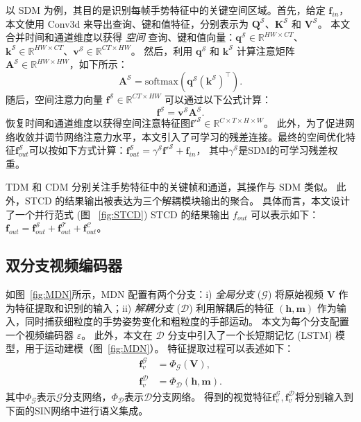 以 SDM 为例，其目的是识别每帧手势特征中的关键空间区域。首先，给定 $\mathbf{f}_{in}$，本文使用 Conv3d 来导出查询、键和值特征，分别表示为 $\mathbf{Q}^{\mathcal{S}}$、$\mathbf{K}^{\mathcal{S}}$ 和 $\mathbf{V}^{\mathcal{S}}$。
本文合并时间和通道维度以获得 \emph{空间} 查询、键和值向量：$\mathbf{q}^{\mathcal{S}}\in \mathbb{R}^{HW\times CT}$、$\mathbf{k}^{\mathcal{S}}\in \mathbb{R}^{HW\times CT}$、$\mathbf{v}^{\mathcal{S}}\in \mathbb{R}^{CT\times HW}$。
然后，利用 $\mathbf{q}^{\mathcal{S}}$ 和 $\mathbf{k}^{\mathcal{S}}$ 计算注意矩阵 $\mathbf{A}^{\mathcal{S}}\in \mathbb{R}^{HW\times HW}$，如下所示：
\begin{equation}
\mathbf{A}^{\mathcal{S}} = \text{softmax}\left(\mathbf{q}^{\mathcal{S}}\left(\mathbf{k}^{\mathcal{S}}\right)^{\top}\right).
\end{equation}
随后，空间注意力向量 $\mathbf{f}^{\mathcal{S}}\in \mathbb{R}^{CT\times HW}$ 可以通过以下公式计算：
\begin{equation}
\mathbf{f}^{\mathcal{S}} = \mathbf{v}^{\mathcal{S}} \mathbf{A}^{\mathcal{S}}.
\end{equation}
恢复时间和通道维度以获得空间注意特征图$\mathbf{f}'^{\mathcal{S}}\in \mathbb{R}^{C\times T\times H\times W}$。
此外，为了促进网络收敛并调节网络注意力水平，本文引入了可学习的残差连接。最终的空间优化特征$\mathbf{f}_{out}^{\mathcal{S}}$可以按如下方式计算：$\mathbf{f}_{out}^{\mathcal{S}} = \gamma^{\mathcal{S}} \mathbf{f}'^{\mathcal{S}} + \mathbf{f}_{in}$，
其中$\gamma^{\mathcal{S}}$是SDM的可学习残差权重。

TDM 和 CDM 分别关注手势特征中的关键帧和通道，其操作与 SDM 类似。
此外，STCD 的结果输出被表达为三个解耦模块输出的聚合。
具体而言，本文设计了一个并行范式 (图 ~\ref{fig:STCD})
STCD 的结果输出 ${f}_{out}$ 可以表示如下：$\mathbf{f}_{out} = \mathbf{f}_{out}^{\mathcal{S}} + \mathbf{f}_{out}^{\mathcal{T}} + \mathbf{f}_{out}^{\mathcal{C}}$。

\subsection{双分支视频编码器}
\label{sec:DBVE}
如图~\ref{fig:MDN}所示，MDN 配置有两个分支：i) \emph{全局分支} ($\mathcal{G}$) 将原始视频 $\mathbf{V}$ 作为特征提取和识别的输入；ii) \emph{解耦分支} ($\mathcal{D}$) 利用解耦后的特征 $\mathbf{(h, m)}$ 作为输入，同时捕获细粒度的手势姿势变化和粗粒度的手部运动。
本文为每个分支配置一个视频编码器 $\varepsilon$。
此外，本文在 $\mathcal{D}$ 分支中引入了一个长短期记忆 (LSTM) 模型，用于运动建模（图~\ref{fig:MDN}）。
特征提取过程可以表述如下：
\begin{equation}
\label{eq:fv}
\begin{aligned}
  \mathbf{f}_{v}^{\mathcal{G}} &= \Phi_{\mathcal{G}}(\mathbf{V}), \\
  \mathbf{f}_{v}^{\mathcal{D}} &= \Phi_{\mathcal{D}}(\mathbf{h}, \mathbf{m}).
\end{aligned}
\end{equation}
其中$\Phi_{\mathcal{G}}$表示$\mathcal{G}$分支网络，$\Phi_{\mathcal{D}}$表示$\mathcal{D}$分支网络。
得到的视觉特征$\mathbf{f}_{v}^{\mathcal{G}}, \mathbf{f}_{v}^{\mathcal{D}}$将分别输入到下面的SIN网络中进行语义集成。

